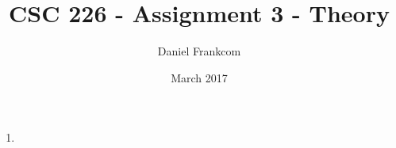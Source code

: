 \documentclass{article}
\title{CSC 226 - Assignment 3 - Theory}
\date{March 2017}
\author{Daniel Frankcom}
\begin{document}
	\maketitle
	\setlength{\parindent}{0pt}
	\newcommand{\forceindent}{\leavevmode{\parindent=72pt\indent}}
	\newpage
	
	\begin{enumerate}
		\item 
	\end{enumerate}
\end{document}
